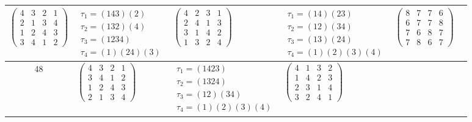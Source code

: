 \begin{longtable}{|c|p{2.7cm}|p{2.7cm}|p{2.7cm}|p{2.7cm}|p{2.7cm}|}
    $\begin{pmatrix} 4 & 3 & 2 & 1 \\ 2 & 1 & 3 & 4 \\ 1 & 2 & 4 & 3 \\ 3 & 4 & 1 & 2 \end{pmatrix}$               &
    $\begin{array}{l}\tau_{1}=(143)(2)\\ \tau_{2}=(132)(4)\\ \tau_{3}=(1234)\\ \tau_{4}=(1)(24)(3)\end{array}$     &
    $\begin{pmatrix} 4 & 2 & 3 & 1 \\ 2 & 4 & 1 & 3 \\ 3 & 1 & 4 & 2 \\ 1 & 3 & 2 & 4 \end{pmatrix}$               &
    $\begin{array}{l}\tau_{1}=(14)(23)\\ \tau_{2}=(12)(34)\\ \tau_{3}=(13)(24)\\ \tau_{4}=(1)(2)(3)(4)\end{array}$ &
    $\begin{pmatrix} 8 & 7 & 7 & 6 \\ 6 & 7 & 7 & 8 \\ 7 & 6 & 8 & 7 \\ 7 & 8 & 6 & 7 \end{pmatrix}$                                                                                           \\
    \hline
    48                                                                                                             &
    $\begin{pmatrix} 4 & 3 & 2 & 1 \\ 3 & 4 & 1 & 2 \\ 1 & 2 & 4 & 3 \\ 2 & 1 & 3 & 4 \end{pmatrix}$               &
    $\begin{array}{l}\tau_{1}=(1423)\\ \tau_{2}=(1324)\\ \tau_{3}=(12)(34)\\ \tau_{4}=(1)(2)(3)(4)\end{array}$     &
    $\begin{pmatrix} 4 & 1 & 3 & 2 \\ 1 & 4 & 2 & 3 \\ 2 & 3 & 1 & 4 \\ 3 & 2 & 4 & 1 \end{pmatrix}$               &

\end{longtable}

